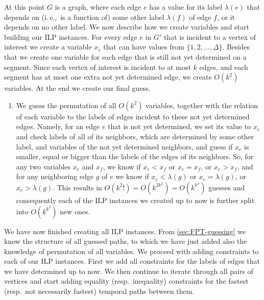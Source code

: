 \documentclass[a4paper,UKenglish,cleveref, autoref, thm-restate, anonymous]{lipics-v2021}
\newcommand{\ie}{i.\,e.,\ }
\newcounter{guesscounter}
\begin{document}
At this point $G$ is a graph, where each edge $e$ has a value for its label $\lambda(e)$
that depends on (\ie is a function of) some other label $\lambda(f)$ of edge $f$,
or it depends on no other label.
We now describe how we create variables and start building our ILP instances. 
For every edge $e$ in $G'$ that is incident to a vertex of interest we create a variable $x_e$ that can have values from $ \{1, 2, \dots, \Delta\}$.
Besides that we create one variable for each edge that is still not yet determined on a segment.
Since each vertex of interest is incident to at most $k$ edges, and each segment has at most one extra not yet determined edge, we create $O(k^2)$ variables.
At the end we create our final guess.
\begin{enumerate}[G-1.]
\setcounter{enumi}{\value{guesscounter}}
    \item \label{FPT:guessallPermutations}
We guess the permutation of all $O(k^2)$ variables,
together with the relation of each variable to the labels of edges incident to these not yet determined edges.
Namely, for an edge $e$ that is not yet determined, we set its value to $x_e$ and check labels of all of its neighbors,
which are determined by some other label,
and variables of the not yet determined neighbors,
and guess if $x_e$ is smaller, equal or bigger than the labels of the edges of its neighbors.
So, for any two variables $x_e$ and $x_f$, we know if $x_e < x_f$ or $x_e = x_f$, or $x_e > x_f$,
and for any neighboring edge $g$ of $e$ we know if $x_e < \lambda(g)$ or 
$x_e = \lambda(g)$, or $x_e > \lambda(g)$.
This results in $O(k^2 !) = O(k^{2k^2}) = O(k^{k^3})$ guesses
and consequently
each of the ILP instances we created up to now is further split into $O(k^{k^3})$ new ones.
\end{enumerate}
We have now finished creating all ILP instances.
From \cref{sec:FPT-guessing} we know the structure of all guessed paths, to which we have just added also the knowledge of permutation of all variables.
We proceed with adding constraints to each of our ILP instances.
First we add all constraints for the labels of edges that we have determined up to now.
We then continue to iterate through all pairs of vertices and start adding equality (resp.~inequality) constraints for the fastest (resp.~not necessarily fastest) temporal paths between them.
\end{document}
